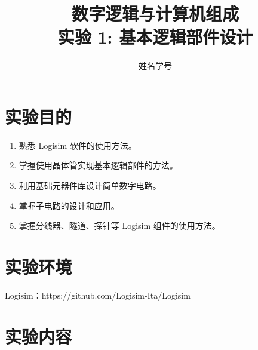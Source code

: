 \documentclass{article}
\title{\songti 数字逻辑与计算机组成\\ {\small 实验 1: 基本逻辑部件设计}}
\author{\kaishu 姓名\quad 学号}
\date{\zhtoday}
\begin{document}
    \maketitle

    \kaishu

    \section{实验目的}

    \begin{enumerate}
        \item 熟悉 Logisim 软件的使用方法。
        \item 掌握使用晶体管实现基本逻辑部件的方法。
        \item 利用基础元器件库设计简单数字电路。
        \item 掌握子电路的设计和应用。
        \item 掌握分线器、隧道、探针等 Logisim 组件的使用方法。
    \end{enumerate}

    \section{实验环境}

    Logisim：https://github.com/Logisim-Ita/Logisim

    \section{实验内容}
\end{document}
